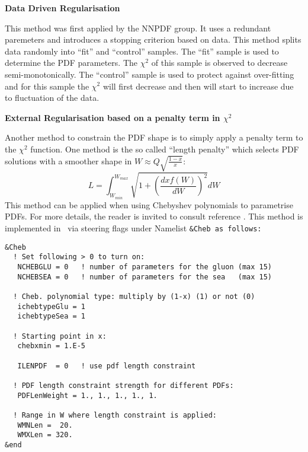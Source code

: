 
\begin{description}

\item \bf{Data Driven Regularisation}\rm

This method was first applied by the NNPDF group.
It uses a redundant paremeters and introduces a stopping criterion based on data. This method splits data randomly
into ``fit'' and ``control''  samples. The ``fit'' sample is used to determine the PDF parameters. 
The $\chi^2$ of this sample is observed to decrease semi-monotonically. 
The ``control'' sample is used to protect against over-fitting and for this sample the $\chi^2$ will first decrease 
and then will start to increase due to fluctuation of the data.


\item \bf{External Regularisation based on a penalty term in $\chi^2$} \rm

Another method to constrain the PDF shape is to simply apply a penalty term
to the $\chi^2$ function. 
One method is the so called ``length penalty'' which selects PDF solutions with a smoother shape in $W\approx Q\sqrt{\frac{1-x}{x}}$:
\begin{equation}
L=\int_{W_{min}}^{W_{max}} \sqrt{1+\left(\frac{dxf(W)}{dW}\right)^2}dW
\end{equation}
This method can be applied when using Chebyshev polynomials to parametrise PDFs.
For more details, the reader is invited to consult  reference \cite{Chebyshev}.
This method is implemented in \fitter\ via steering flags under Namelist \tt \&Cheb \rm as follows:
\begin{verbatim}
&Cheb
  ! Set following > 0 to turn on:
   NCHEBGLU = 0   ! number of parameters for the gluon (max 15)
   NCHEBSEA = 0   ! number of parameters for the sea   (max 15)

  ! Cheb. polynomial type: multiply by (1-x) (1) or not (0)  
   ichebtypeGlu = 1 
   ichebtypeSea = 1 

  ! Starting point in x:
   chebxmin = 1.E-5

   ILENPDF  = 0   ! use pdf length constraint

  ! PDF length constraint strength for different PDFs:
   PDFLenWeight = 1., 1., 1., 1., 1.     

  ! Range in W where length constraint is applied:
   WMNLen =  20.
   WMXLen = 320.
&end
\end{verbatim}


\end{description}
